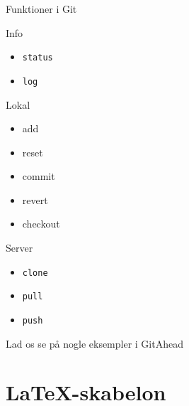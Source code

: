 \documentclass[10pt]{beamer}
\begin{document}
\begin{frame}{Funktioner i Git}
  \begin{minipage}[t]{0.3\textwidth}
    \begin{block}{Info}
      \begin{itemize}
      \item \texttt{status}
      \item \texttt{log}
      \end{itemize}
    \end{block}
  \end{minipage}
  \begin{minipage}[t]{0.3\textwidth}
    \begin{block}{Lokal}
      \begin{itemize}
        \ttfamily
      \item add
      \item reset
      \item commit
      \item revert
      \item checkout
      \end{itemize}
    \end{block}
  \end{minipage}
  \begin{minipage}[t]{0.3\textwidth}
    \begin{block}{Server}
      \begin{itemize}
      \item \texttt{clone}
      \item \texttt{pull}
      \item \texttt{push}
      \end{itemize}
    \end{block}
  \end{minipage}

  \begin{block}{}
    Lad os se på nogle eksempler i GitAhead
  \end{block}
\end{frame}

\section{\LaTeX-skabelon}
\label{sec:template}
\end{document}
